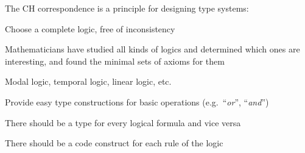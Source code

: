 The CH correspondence is a principle for designing type systems:

Choose a complete logic, free of inconsistency

Mathematicians have studied all kinds of logics and determined which
ones are interesting, and found the minimal sets of axioms for them

Modal logic, temporal logic, linear logic, etc.

Provide easy type constructions for basic operations (e.g.~``\emph{or}'',
``\emph{and}'')

There should be a type for every logical formula and vice versa

There should be a code construct for each rule of the logic 

\begin{comment}
you have code like this it means that at some point in your program
in the expression you are able to compute a value X of type T now
of course we're assuming that your program is correct and running
and your expression is being evaluated correctly so if so you have
a value of type T let's denote this proposition by CH of T meaning
that code has a value of type T the curry habit respondents is a correspondence
between types and prepositions and also between values and proofs
on the one side there is program code in a functional language that
program has types and expressions that have those types or values
of those types on the other side of the correspondence there is formal
logic which has prepositions and these prepositions can be true or
false the formal logic has proofs of prepositions so true prepositions
follow from axioms or from other already proved prepositions so in
this tutorial I will explore this correspondence using Scala as usual
as in all my lectures


\end{comment}
